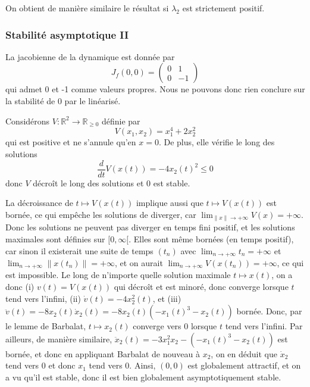 On obtient de manière similaire le résultat si \(\lambda_2\) est
strictement positif.

\hypertarget{answer-asymp_glob-2}{%
\subsubsection*{Stabilité asymptotique II}\label{answer-asymp_glob-2}}


La jacobienne de la dynamique est donnée par \[
J_f(0,0) = 
\left(
\begin{matrix}
0 & 1 \\
0 & -1
\end{matrix}
\right)
\] qui admet 0 et -1 comme valeurs propres. Nous ne pouvons donc rien
conclure sur la stabilité de 0 par le linéarisé.

Considérons \(V:\mathbb{R}^2\to \mathbb{R}_{\geq 0}\) définie par \[
V(x_1,x_2)= x_1^4 + 2 x_2^2
\] qui est positive et ne s'annule qu'en \(x=0\). De plus, elle vérifie
le long des solutions \[
\frac{d}{dt} V(x(t)) = - 4x_2(t)^2 \leq 0
\] donc \(V\) décroît le long des solutions et 0 est stable.

La décroissance de \(t\mapsto V(x(t))\) implique aussi que
\(t\mapsto V(x(t))\) est bornée, ce qui empêche les solutions de
diverger, car \(\lim_{\|x\|\to +\infty} V(x) = +\infty\). Donc les
solutions ne peuvent pas diverger en temps fini positif, et les
solutions maximales sont définies sur \([0,\infty[\). Elles sont même
bornées (en temps positif), car sinon il existerait une suite de temps
\((t_n)\) avec \(\lim_{n\to +\infty} t_n=+\infty\) et
\(\lim_{n\to +\infty} \|x(t_n)\|=+\infty\), et on aurait
\(\lim_{n\to +\infty} V(x(t_n))=+\infty\), ce qui est impossible. Le
long de n'importe quelle solution maximale \(t\mapsto x(t)\), on a donc
(i) \(v(t)=V(x(t))\) qui décroît et est minoré, donc converge lorsque
\(t\) tend vers l'infini, (ii) \(\dot{v}(t) = - 4x_2^2(t)\), et (iii)
\(\ddot{v}(t)= - 8x_2(t)\dot{x}_2(t)=- 8x_2(t)(-x_1(t)^3-x_2(t))\)
bornée. Donc, par le lemme de Barbalat, \(t\mapsto x_2(t)\) converge
vers 0 lorsque \(t\) tend vers l'infini. Par ailleurs, de manière
similaire, \(\ddot{x}_2(t) = -3x_1^2x_2-(-x_1(t)^3-x_2(t))\) est bornée,
et donc en appliquant Barbalat de nouveau à \(x_2\), on en déduit que
\(\dot{x}_2\) tend vers 0 et donc \(x_1\) tend vers 0. Ainsi, \((0,0)\)
est globalement attractif, et on a vu qu'il est stable, donc il est bien
globalement asymptotiquement stable.

